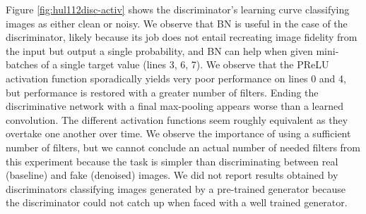 Figure \ref{fig:hul112disc-activ} shows the discriminator's learning curve classifying images as either clean or noisy. We observe that \acl{BN} is useful in the case of the discriminator, likely because its job does not entail recreating image fidelity from the input but output a single probability, and \acl{BN} can help when given mini-batches of a single target value (lines 3, 6, 7). We observe that the \ac{PReLU} activation function sporadically yields very poor performance on lines 0 and 4, but performance is restored with a greater number of filters. Ending the discriminative network with a final max-pooling appears worse than a learned convolution. The different activation functions seem roughly equivalent as they overtake one another over time. We observe the importance of using a sufficient number of filters, but we cannot conclude an actual number of needed filters from this experiment because the task is simpler than discriminating between real (baseline) and fake (denoised) images. We did not report results obtained by discriminators classifying images generated by a pre-trained generator because the discriminator could not catch up when faced with a well trained generator.%

